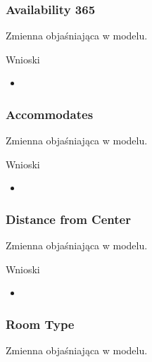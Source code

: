 \subsubsection{Availability 365}\label{subsubsec:availability-365}
Zmienna objaśniająca w modelu.


Wnioski

\begin{itemize}
    \item
\end{itemize}

\subsubsection{Accommodates}\label{subsubsec:accommodates}
Zmienna objaśniająca w modelu.



Wnioski

\begin{itemize}
    \item
\end{itemize}

\subsubsection{Distance from Center}\label{subsubsec:distance-from-center}
Zmienna objaśniająca w modelu.




Wnioski

\begin{itemize}
    \item
\end{itemize}

\subsubsection{Room Type}\label{subsubsec:room-type}
Zmienna objaśniająca w modelu.


